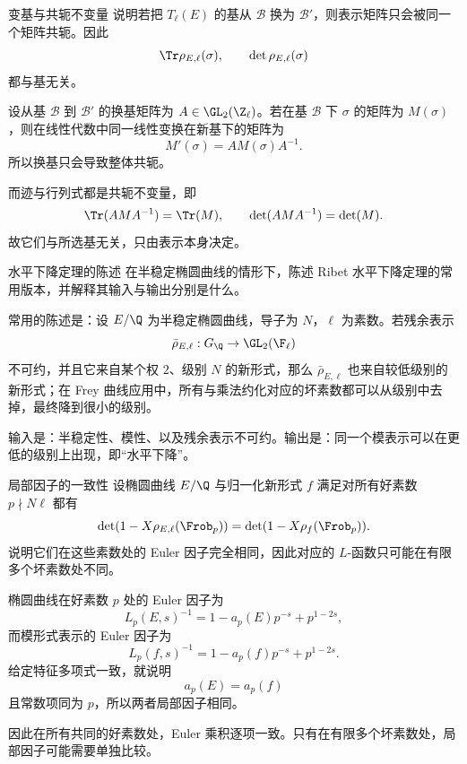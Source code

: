 \begin{problem}{变基与共轭不变量}
\medium
说明若把 $T_\ell(E)$ 的基从 $\mathcal B$ 换为 $\mathcal B'$，则表示矩阵只会被同一个矩阵共轭。因此
\[
\Tr\rho_{E,\ell}(\sigma),\qquad \det\rho_{E,\ell}(\sigma)
\]
都与基无关。
\end{problem}
\begin{solution}
设从基 $\mathcal B$ 到 $\mathcal B'$ 的换基矩阵为 $A\in\GL_2(\Z_\ell)$。若在基 $\mathcal B$ 下 $\sigma$ 的矩阵为 $M(\sigma)$，则在线性代数中同一线性变换在新基下的矩阵为
\[
M'(\sigma)=AM(\sigma)A^{-1}.
\]
所以换基只会导致整体共轭。

而迹与行列式都是共轭不变量，即
\[
\Tr(AMA^{-1})=\Tr(M),
\qquad
\det(AMA^{-1})=\det(M).
\]
故它们与所选基无关，只由表示本身决定。
\end{solution}

\begin{problem}{水平下降定理的陈述}
\medium
在半稳定椭圆曲线的情形下，陈述 Ribet 水平下降定理的常用版本，并解释其输入与输出分别是什么。
\end{problem}
\begin{solution}
常用的陈述是：设 $E/\Q$ 为半稳定椭圆曲线，导子为 $N$，$\ell$ 为素数。若残余表示
\[
\bar\rho_{E,\ell}:G_\Q\to\GL_2(\F_\ell)
\]
不可约，并且它来自某个权 $2$、级别 $N$ 的新形式，那么 $\bar\rho_{E,\ell}$ 也来自较低级别的新形式；在 Frey 曲线应用中，所有与乘法约化对应的坏素数都可以从级别中去掉，最终降到很小的级别。

输入是：半稳定性、模性、以及残余表示不可约。输出是：同一个模表示可以在更低的级别上出现，即“水平下降”。
\end{solution}

\begin{problem}{局部因子的一致性}
\medium
设椭圆曲线 $E/\Q$ 与归一化新形式 $f$ 满足对所有好素数 $p\nmid N\ell$ 都有
\[
\det(1-X\rho_{E,\ell}(\Frob_p))=
\det(1-X\rho_f(\Frob_p)).
\]
说明它们在这些素数处的 Euler 因子完全相同，因此对应的 $L$-函数只可能在有限多个坏素数处不同。
\end{problem}
\begin{solution}
椭圆曲线在好素数 $p$ 处的 Euler 因子为
\[
L_p(E,s)^{-1}=1-a_p(E)p^{-s}+p^{1-2s},
\]
而模形式表示的 Euler 因子为
\[
L_p(f,s)^{-1}=1-a_p(f)p^{-s}+p^{1-2s}.
\]
给定特征多项式一致，就说明
\[
a_p(E)=a_p(f)
\]
且常数项同为 $p$，所以两者局部因子相同。

因此在所有共同的好素数处，Euler 乘积逐项一致。只有在有限多个坏素数处，局部因子可能需要单独比较。
\end{solution}

